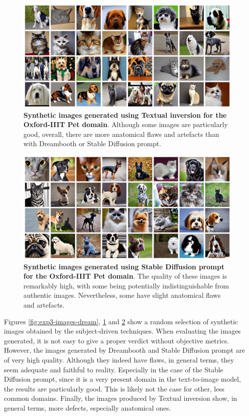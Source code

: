 \begin{figure}
    \centering
    \includegraphics[width=1\textwidth]{Pictures/textual-inversion-img.png} 
    \caption{\textbf{Synthetic images generated using Textual inversion for the Oxford-IIIT Pet domain}. Although some images are particularly good, overall, there are more anatomical flaws and artefacts than with Dreambooth or Stable Diffusion prompt.}
    \label{fig:exp3-images-text}
\end{figure}

\begin{figure}
    \centering
    \includegraphics[width=1\textwidth]{Pictures/stable_diffusion_prompt-img.png} 
    \caption{\textbf{Synthetic images generated using Stable Diffusion prompt for the Oxford-IIIT Pet domain}. The quality of these images is remarkably high, with some being potentially indistinguishable from authentic images. Nevertheless, some have slight anatomical flaws and artefacts.}
    \label{fig:exp3-images-sd}
\end{figure}

Figures \ref{fig:exp3-images-dream}, \ref{fig:exp3-images-text} and \ref{fig:exp3-images-sd} show a random selection of synthetic images obtained by the subject-driven techniques. When evaluating the images generated, it is not easy to give a proper verdict without objective metrics. However, the images generated by Dreambooth and Stable Diffusion prompt are of very high quality. Although they indeed have flaws, in general terms, they seem adequate and faithful to reality. Especially in the case of the Stable Diffusion prompt, since it is a very present domain in the text-to-image model, the results are particularly good. This is likely not the case for other, less common domains. Finally, the images produced by Textual inversion show, in general terms, more defects, especially anatomical ones.

